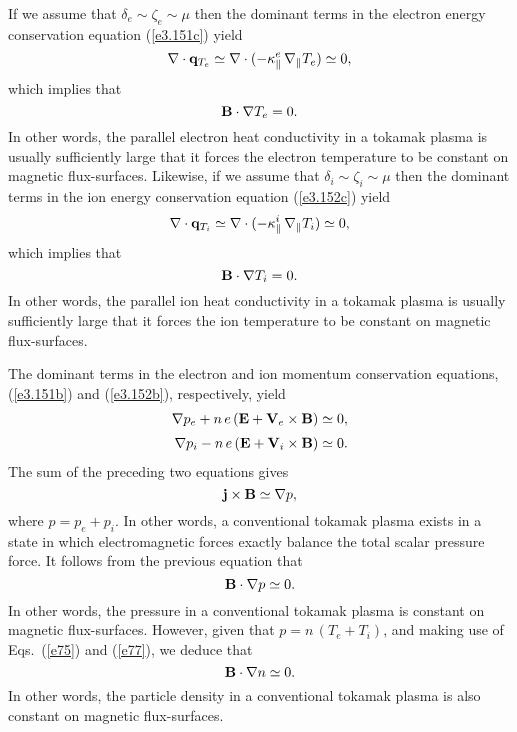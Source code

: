 \documentclass[notitlepage,12pt]{article}
\begin{document}
If we assume that $\delta_e\sim \zeta_e\sim \mu$ then the dominant terms in the electron energy conservation equation
(\ref{e3.151c}) yield
\begin{equation}
\nabla\cdot{\bf q}_{T_e}\simeq \nabla\cdot(-\kappa_\parallel^e\,\nabla_\parallel T_e)\simeq 0,
\end{equation}
which implies that 
\begin{equation}
{\bf B}\cdot\nabla T_e=0. \label{e75}
\end{equation}
In other words, the parallel electron heat conductivity in a tokamak plasma is usually
sufficiently large that it forces the electron temperature to be constant on magnetic flux-surfaces. 
Likewise, if we assume that $\delta_i\sim \zeta_i\sim \mu$ then the dominant terms in the ion energy conservation equation
(\ref{e3.152c}) yield
\begin{equation}
\nabla\cdot{\bf q}_{T_i}\simeq \nabla\cdot(-\kappa_\parallel^i\,\nabla_\parallel T_i)\simeq 0,
\end{equation}
which implies that 
\begin{equation}
{\bf B}\cdot\nabla T_i=0.\label{e77}
\end{equation}
In other words, the parallel ion heat conductivity in a tokamak plasma is usually
sufficiently large that it forces the ion temperature to be constant on magnetic flux-surfaces. 

 The dominant terms in the electron and ion momentum conservation equations,
(\ref{e3.151b}) and (\ref{e3.152b}), respectively, yield
\begin{align}\label{e78}
\nabla p_e + n\,e\,({\bf E}+{\bf V}_e\times {\bf B}) &\simeq 0,\\[0.5ex]
\nabla p_i - n\,e\,({\bf E}+{\bf V}_i\times {\bf B}) &\simeq 0.\label{e79}
\end{align}
The sum of the preceding two equations gives
\begin{equation}\label{e80}
 {\bf j}\times {\bf B} \simeq\nabla p,
\end{equation}
where $p=p_e+p_i$. In other words, a conventional tokamak plasma exists in a state in which electromagnetic
forces exactly balance the  total scalar pressure force. 
It follows from the previous equation that 
\begin{equation}
{\bf B}\cdot\nabla p\simeq 0.
\end{equation}
In other words, the pressure in a conventional tokamak plasma is constant on magnetic flux-surfaces. 
 However, given that $p=n\,(T_e+T_i)$, and making use of Eqs.~(\ref{e75}) and (\ref{e77}), we deduce that 
\begin{equation}
{\bf B}\cdot\nabla n\simeq 0.
\end{equation}
In other words, the particle density in a conventional tokamak plasma is also  constant on
magnetic flux-surfaces. 
\end{document}
